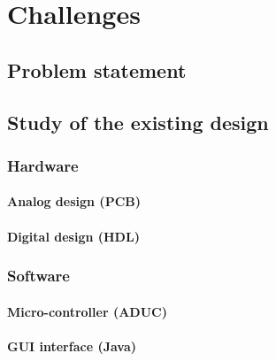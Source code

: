 \chapter{Challenges}
\section{Problem statement}
\section{Study of the existing design}
\subsection{Hardware}
\subsubsection{Analog design (PCB)}
\subsubsection{Digital design (HDL)}
\subsection{Software}
\subsubsection{Micro-controller (ADUC)}
\subsubsection{GUI interface (Java)}

